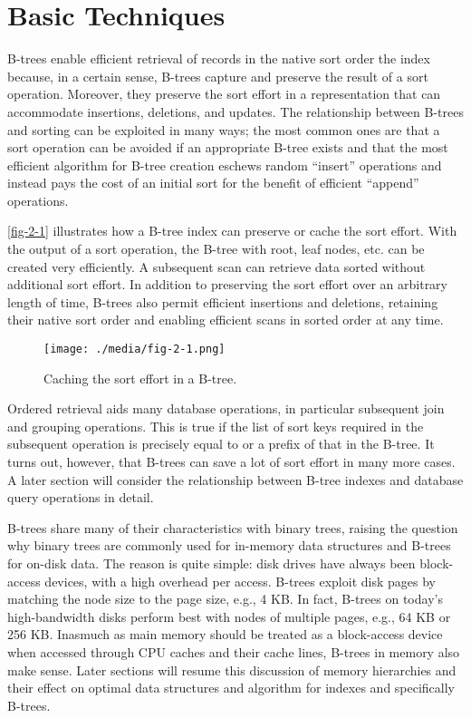\hypertarget{basic-techniques}{%
\chapter{Basic Techniques}\label{basic-techniques}}

B-trees enable efficient retrieval of records in the native sort order
the index because, in a certain sense, B-trees capture and preserve the
result of a sort operation. Moreover, they preserve the sort effort in a
representation that can accommodate insertions, deletions, and updates.
The relationship between B-trees and sorting can be exploited in many
ways; the most common ones are that a sort operation can be avoided if
an appropriate B-tree exists and that the most efficient algorithm for
B-tree creation eschews random ``insert'' operations and instead pays
the cost of an initial sort for the benefit of efficient ``append''
operations.

\autoref{fig-2-1} illustrates how a B-tree index can preserve or cache the sort
effort. With the output of a sort operation, the B-tree with root, leaf
nodes, etc. can be created very efficiently. A subsequent scan can
retrieve data sorted without additional sort effort. In addition to
preserving the sort effort over an arbitrary length of time, B-trees
also permit efficient insertions and deletions, retaining their native
sort order and enabling efficient scans in sorted order at any time.

\begin{figure}
  \centering
  \texttt{[image: ./media/fig-2-1.png]}

  \caption{Caching the sort effort in a B-tree.\label{fig-2-1}}
\end{figure}

Ordered retrieval aids many database operations, in particular
subsequent join and grouping operations. This is true if the list of
sort keys required in the subsequent operation is precisely equal to or
a prefix of that in the B-tree. It turns out, however, that B-trees can
save a lot of sort effort in many more cases. A later section will
consider the relationship between B-tree indexes and database query
operations in detail.

B-trees share many of their characteristics with binary trees, raising
the question why binary trees are commonly used for in-memory data
structures and B-trees for on-disk data. The reason is quite simple:
disk drives have always been block-access devices, with a high overhead
per access. B-trees exploit disk pages by matching the node size to the
page size, e.g., 4 KB. In fact, B-trees on today's high-bandwidth disks
perform best with nodes of multiple pages, e.g., 64 KB or 256 KB.
Inasmuch as main memory should be treated as a block-access device when
accessed through CPU caches and their cache lines, B-trees in memory
also make sense. Later sections will resume this discussion of memory
hierarchies and their effect on optimal data structures and algorithm
for indexes and specifically B-trees.

